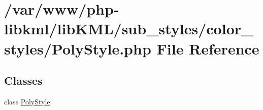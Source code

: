 \hypertarget{PolyStyle_8php}{
\section{/var/www/php-\/libkml/libKML/sub\_\-styles/color\_\-styles/PolyStyle.php File Reference}
\label{dd/da5/PolyStyle_8php}
}
\subsection*{Classes}
\begin{DoxyCompactItemize}
\item 
class \hyperlink{classPolyStyle}{PolyStyle}
\end{DoxyCompactItemize}

